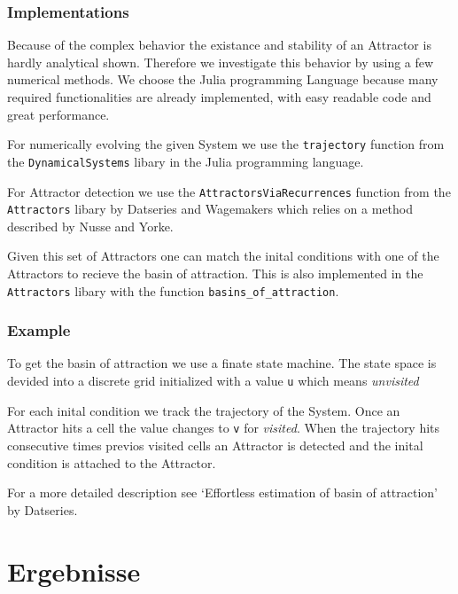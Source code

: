\documentclass[a4paper,12pt, twoside]{article} %
\begin{document}
\subsubsection{Implementations}

Because of the complex behavior the existance and stability of an Attractor is hardly 
analytical shown. Therefore we investigate this behavior by using a few numerical methods. 
We choose the Julia programming Language because many required functionalities are already implemented, 
with easy readable code and great performance.\par

For numerically evolving the given System we use the \texttt{trajectory} function from the \texttt{DynamicalSystems} 
libary in the Julia programming language.\par

For Attractor detection we use the \texttt{AttractorsViaRecurrences} function from the \texttt{Attractors} 
libary by  Datseries and Wagemakers which relies on a method described by Nusse and Yorke.\par

Given this set of Attractors one can match the inital conditions with one of the Attractors to recieve the 
basin of attraction. This  is also implemented in the \texttt{Attractors} libary with the function 
\texttt{basins_of_attraction}.

\subsubsection{Example}
To get the basin of attraction we use a finate state machine. The state space is devided into a discrete 
grid initialized with a value \texttt{u} which means \textit{unvisited}\par

For each inital condition we track the trajectory of the System. Once an Attractor hits a cell the value 
changes to \texttt{v} for \textit{visited}. When the trajectory hits consecutive times previos visited cells 
an Attractor is detected and the inital condition is attached to the Attractor.\par

For a more detailed description see `Effortless estimation of basin of attraction' by Datseries.

\section{Ergebnisse}
\end{document}

